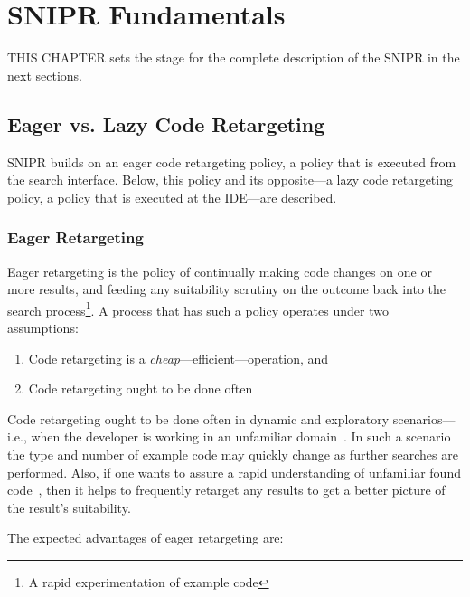 \chapter{\uppercase{SnipR} Fundamentals}{}
\label{sec:fundamentals}


\lettrine[lraise=0.1, nindent=0em, slope=-.5em]{T} {HIS CHAPTER} sets the stage for the complete description of the \uppercase{SnipR} in the next sections.

\section{Eager vs. Lazy Code Retargeting}
\label{sec:eagervslazy}

\uppercase{SnipR} builds on an eager code retargeting policy, a policy that is executed from the search interface. Below, this policy and its opposite---a lazy code retargeting policy, a policy that is executed at the IDE---are described.

\subsection{Eager Retargeting}

Eager retargeting is the policy of continually making code changes on one or more results, and feeding any suitability scrutiny on the outcome back into the search process\footnote{A rapid experimentation of example code}. A process that has such a policy operates under two assumptions:

\begin{enumerate}
	\item Code retargeting is a \emph{cheap}---efficient---operation, and
	\item Code retargeting ought to be done often
\end{enumerate}

Code retargeting ought to be done often in dynamic and exploratory scenarios---i.e., when the developer is working in an unfamiliar domain~\cite{Brandt:2009ew}. In such a scenario the type and number of example code may quickly change as further searches are performed. Also, if one wants to assure a rapid understanding of unfamiliar found code~\cite{Brandt:2009ew}, then it helps to frequently retarget any results to get a better picture of the result's suitability.

The expected advantages of eager retargeting are:

